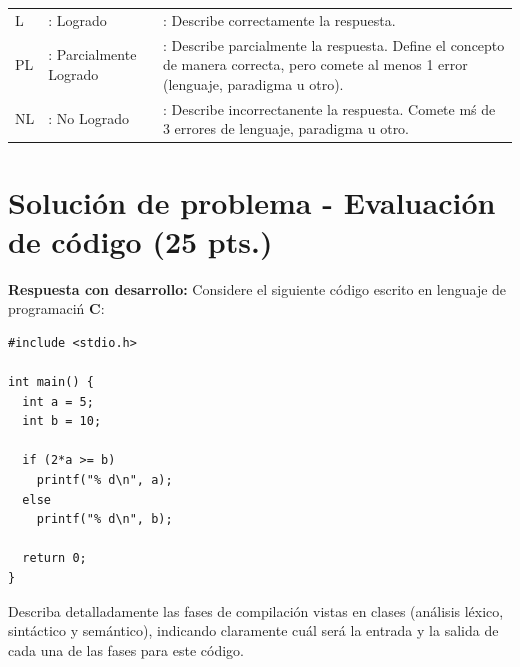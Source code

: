 \documentclass{exam}
\begin{document}
\begin{table}[H]
    {\small
    \begin{tabular}{lll}
        L  & : Logrado    & : Describe correctamente la respuesta. \\
        PL  & : Parcialmente Logrado & : Describe parcialmente la respuesta. Define el concepto de manera correcta, pero comete al menos 1 error (lenguaje, paradigma u otro).  \\
        NL & : No Logrado & : Describe incorrectanente la respuesta. Comete m\'s de 3 errores de lenguaje, paradigma u otro. \\
    \end{tabular}}
\end{table}

\clearpage

\vspace{-7mm}
\section{\textbf{Soluci\'on de problema - Evaluaci\'on de c\'odigo (25 pts.)}}

\noindent
\textbf{Respuesta con desarrollo:} Considere el siguiente c\'odigo escrito en lenguaje de programaci\'n \textbf{C}:
    
\begin{lstlisting}[style=CStyle]
#include <stdio.h>

int main() {
  int a = 5;
  int b = 10;
  
  if (2*a >= b)
    printf("% d\n", a);
  else 
    printf("% d\n", b);

  return 0;
}
\end{lstlisting}

\noindent
Describa detalladamente las fases de compilaci\'on vistas en clases (an\'alisis l\'exico, sint\'actico y sem\'antico), indicando claramente cu\'al ser\'a la entrada y la salida de cada una de las fases para este c\'odigo. 
\end{document}
